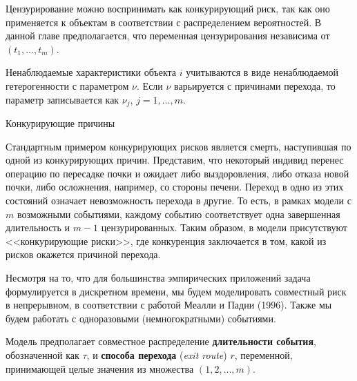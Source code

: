 Цензурирование можно воспринимать как конкурирующий риск, так как оно применяется к объектам в соответствии с распределением вероятностей. В данной главе предполагается, что переменная цензурирования независима от $(t_1, \ldots , t_m)$.

Ненаблюдаемые характеристики объекта $i$ учитываются в виде ненаблюдаемой гетерогенности с параметром $\nu$. Если $\nu$ варьируется с причинами перехода, то параметр записывается как $\nu_j$, $j = 1, \ldots , m$.

        \begin{center}Конкурирующие причины\end{center}
        \noindent
Стандартным примером конкурирующих рисков является смерть, наступившая по одной из конкурирующих причин. Представим, что некоторый индивид перенес операцию по пересадке почки и ожидает либо выздоровления, либо отказа новой почки, либо осложнения, например, со стороны печени. Переход в одно из этих состояний означает невозможность перехода в другие. То есть, в рамках модели с $m$ возможными событиями, каждому событию соответствует одна завершенная длительность и $m - 1$ цензурированных. Таким образом, в модели присутствуют <<конкурирующие риски>>, где конкуренция заключается в том, какой из рисков окажется причиной перехода.

Несмотря на то, что для большинства эмпирических приложений задача формулируется в дискретном времени, мы будем моделировать совместный риск в непрерывном, в соответствии с работой Меалли и Падни (1996). Также мы будем работать с одноразовыми (немногократными) событиями.

Модель предполагает совместное распределение \textbf{длительности события}, обозначенной как $\tau$, и \textbf{способа перехода} (\textit{exit route}) $r$, переменной, принимающей целые значения из множества $(1, 2, \ldots , m)$.


